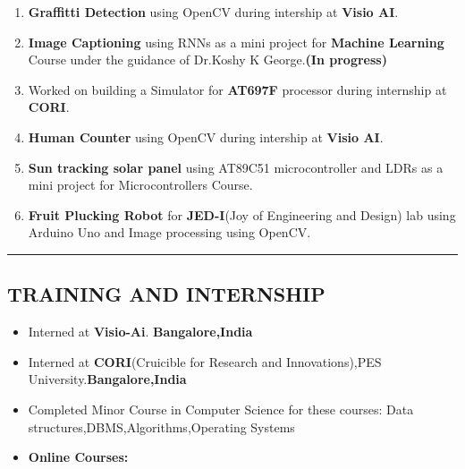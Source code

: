 \documentclass[10pt,letterpaper]{article}
\begin{document}
\begin{enumerate}
\parskip=-0.5em

\item \textbf{Graffitti Detection} using OpenCV during intership at \textbf{Visio AI}.
\vspace{1.0em}

\item \textbf{Image Captioning} using RNNs  as a mini project for {\bf Machine Learning} Course under the guidance of Dr.Koshy K George.\textbf{(In progress)}
\vspace{1.0em}

\item Worked on building a Simulator  for \textbf{AT697F} processor during internship at \textbf{CORI}.
\vspace{1.0em}

\item \textbf{Human Counter} using OpenCV during intership at \textbf{Visio AI}.
\vspace{1.0em}

 \item \textbf{Sun tracking solar panel} using AT89C51 microcontroller and LDRs as a mini project for Microcontrollers Course.
\vspace{1.0em}

\item\textbf{Fruit Plucking Robot} for \textbf{JED-I}(Joy of Engineering and Design) lab using Arduino Uno and Image processing using OpenCV.

\end{enumerate}

\hrule
\subsection*{TRAINING AND INTERNSHIP}

\begin{itemize}
\parskip=-0.5em

\item Interned at \textbf{Visio-Ai}. \hfill  \textbf{Bangalore,India}
\vspace{1.0em}

\item Interned at \textbf{CORI}(Cruicible for Research and Innovations),PES University.\hfill \textbf{Bangalore,India}
\vspace{1.0em}

\item Completed Minor Course in Computer Science for these courses: Data structures,DBMS,Algorithms,Operating Systems
\vspace{1.0em}

\item \textbf{Online Courses:}

\end{itemize}
\end{document}
